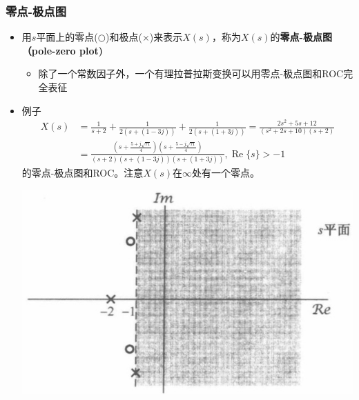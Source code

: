 \documentclass[CJKutf8,dvipsnames,table]{beamer}
\begin{document}
\begin{CJK*}{UTF8}{song}
  \begin{frame}
    \frametitle{零点-极点图}
    \begin{itemize}
	\item 用$s$平面上的零点($\bigcirc$)和极点($\times$)来表示$X(s)$，称为$X(s)$的\textbf{零点-极点图（pole-zero plot)}
		\begin{itemize}
		\item 除了一个常数因子外，一个有理拉普拉斯变换可以用零点-极点图和ROC完全表征	
		\end{itemize}
	\item 例子
	\begin{align*}
	   	X(s) & = \frac{1}{s+2} + \frac{1}{2(s+(1-3j))} + \frac{1}{2(s+(1+3j))} = \frac{2s^2+5s+12}{(s^2+2s+10)(s+2)} \\
		     & = \frac{(s+\frac{5+j\sqrt{71}}{4})(s+\frac{5-j\sqrt{71}}{4})}{(s+2)(s+(1-3j))(s+(1+3j))}, \operatorname{Re}\{s\}>-1
	\end{align*}
	的零点-极点图和ROC。注意$X(s)$在$\infty$处有一个零点。
		\begin{center}
    	\includegraphics[scale=.28]{ss-c-f9-2b}
    	\end{center}
    \end{itemize}
  \end{frame}  
      

\end{CJK*}
\end{document}

